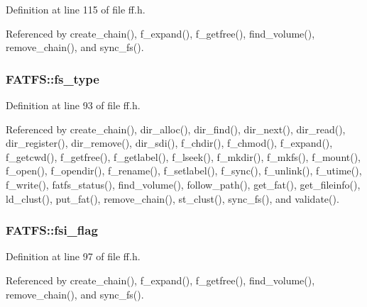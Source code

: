 Definition at line 115 of file ff.\+h.



Referenced by create\+\_\+chain(), f\+\_\+expand(), f\+\_\+getfree(), find\+\_\+volume(), remove\+\_\+chain(), and sync\+\_\+fs().

\subsubsection[{\texorpdfstring{fs\+\_\+type}{fs_type}}]{ F\+A\+T\+F\+S\+::fs\+\_\+type}\hypertarget{structFATFS_add27d97babe807b573eac98a71dc4ae5}{}\label{structFATFS_add27d97babe807b573eac98a71dc4ae5}


Definition at line 93 of file ff.\+h.



Referenced by create\+\_\+chain(), dir\+\_\+alloc(), dir\+\_\+find(), dir\+\_\+next(), dir\+\_\+read(), dir\+\_\+register(), dir\+\_\+remove(), dir\+\_\+sdi(), f\+\_\+chdir(), f\+\_\+chmod(), f\+\_\+expand(), f\+\_\+getcwd(), f\+\_\+getfree(), f\+\_\+getlabel(), f\+\_\+lseek(), f\+\_\+mkdir(), f\+\_\+mkfs(), f\+\_\+mount(), f\+\_\+open(), f\+\_\+opendir(), f\+\_\+rename(), f\+\_\+setlabel(), f\+\_\+sync(), f\+\_\+unlink(), f\+\_\+utime(), f\+\_\+write(), fatfs\+\_\+status(), find\+\_\+volume(), follow\+\_\+path(), get\+\_\+fat(), get\+\_\+fileinfo(), ld\+\_\+clust(), put\+\_\+fat(), remove\+\_\+chain(), st\+\_\+clust(), sync\+\_\+fs(), and validate().

\subsubsection[{\texorpdfstring{fsi\+\_\+flag}{fsi_flag}}]{ F\+A\+T\+F\+S\+::fsi\+\_\+flag}\hypertarget{structFATFS_a84e9cdc5a6a8e33ea7ec192058abf161}{}\label{structFATFS_a84e9cdc5a6a8e33ea7ec192058abf161}


Definition at line 97 of file ff.\+h.



Referenced by create\+\_\+chain(), f\+\_\+expand(), f\+\_\+getfree(), find\+\_\+volume(), remove\+\_\+chain(), and sync\+\_\+fs().

